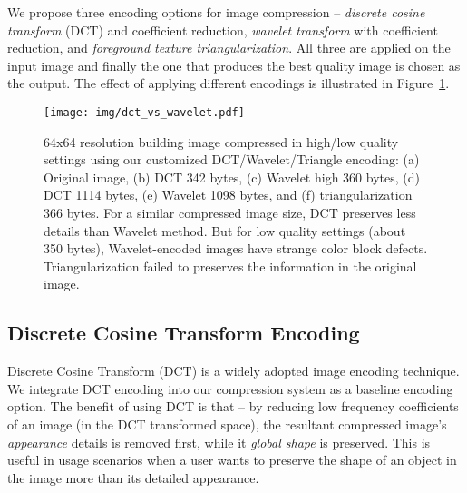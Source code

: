 
We propose three encoding options for image compression -- \textit{discrete cosine transform} (DCT) and coefficient reduction, \textit{wavelet transform} with coefficient reduction, and \textit{foreground texture triangularization}. All three are applied on the input image and finally the one that produces the best quality image is chosen as the output. The effect of applying different encodings is illustrated in Figure~\ref{fig:block7}.


\begin{figure}[!thb]
    \begin{center}
	    \texttt{[image: img/dct\_vs\_wavelet.pdf]}
	    \caption{\footnotesize 64x64 resolution building image compressed in high/low quality settings using our customized DCT/Wavelet/Triangle encoding: (a) Original image, (b) DCT 342 bytes, (c) Wavelet high 360 bytes, (d) DCT 1114 bytes, (e) Wavelet 1098 bytes, and (f) triangularization 366 bytes. For a similar compressed image size, DCT preserves less details than Wavelet method. But for low quality settings (about 350 bytes), Wavelet-encoded images have strange color block defects. Triangularization failed to preserves the information in the original image.}
	    \label{fig:block7}
    \end{center}
\end{figure}


\subsection{Discrete Cosine Transform Encoding}

Discrete Cosine Transform (DCT) is a widely adopted image encoding technique. We integrate DCT encoding into our compression system as a baseline encoding option. The benefit of using DCT is that -- by reducing low frequency coefficients of an image (in the DCT transformed space), the resultant compressed image's \textit{appearance} details is removed first, while it \textit{global shape} is preserved. This is useful in usage scenarios when a user wants to preserve the shape of an object in the image more than its detailed appearance.

